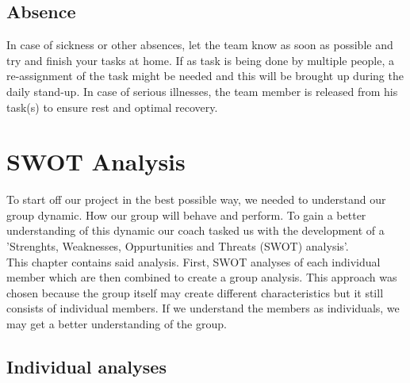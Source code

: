 \documentclass[12pt]{article}
\begin{document}
	\subsection{Absence}
	In case of sickness or other absences, let the team know as soon as possible and try and finish your tasks at home. If as task is being done by multiple people, a re-assignment of the task might be needed and this will be brought up during the daily stand-up. In case of serious illnesses, the team member is released from his task(s) to ensure rest and optimal recovery.
	\newpage
	\section{SWOT Analysis}
	To start off our project in the best possible way, we needed to understand our group dynamic. How our group will behave and perform. To gain a better understanding of this dynamic our coach tasked us with the development of a 'Strenghts, Weaknesses, Oppurtunities and Threats (SWOT) analysis'.\\ This chapter contains said analysis. First, SWOT analyses of each individual member which are then combined to create a group analysis. This approach was chosen because the group itself may create different characteristics but it still consists of individual members. If we understand the members as individuals, we may get a better understanding of the group. 
	
	\subsection{Individual analyses}
\end{document}
